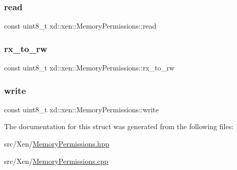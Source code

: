 \subsubsection{\texorpdfstring{read}{read}}
{\footnotesize\ttfamily const uint8\+\_\+t xd\+::xen\+::\+Memory\+Permissions\+::read}

\mbox{\label{structxd_1_1xen_1_1_memory_permissions_aa5d67546efda0e4ddb6cfa9b662ff5b1}} 
\subsubsection{\texorpdfstring{rx\+\_\+to\+\_\+rw}{rx\_to\_rw}}
{\footnotesize\ttfamily const uint8\+\_\+t xd\+::xen\+::\+Memory\+Permissions\+::rx\+\_\+to\+\_\+rw}

\mbox{\label{structxd_1_1xen_1_1_memory_permissions_a7fb66430d91836c5d24f031fa67b0914}} 
\subsubsection{\texorpdfstring{write}{write}}
{\footnotesize\ttfamily const uint8\+\_\+t xd\+::xen\+::\+Memory\+Permissions\+::write}



The documentation for this struct was generated from the following files\+:\begin{DoxyCompactItemize}
\item 
src/\+Xen/\mbox{\hyperlink{_memory_permissions_8hpp}{Memory\+Permissions.\+hpp}}\item 
src/\+Xen/\mbox{\hyperlink{_memory_permissions_8cpp}{Memory\+Permissions.\+cpp}}\end{DoxyCompactItemize}
